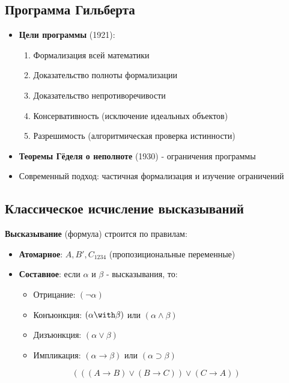 \subsection{Программа Гильберта}

\begin{itemize}
\item \textbf{Цели программы} (1921):
\begin{enumerate}
\item Формализация всей математики
\item Доказательство полноты формализации
\item Доказательство непротиворечивости
\item Консервативность (исключение идеальных объектов)
\item Разрешимость (алгоритмическая проверка истинности)
\end{enumerate}

\item \textbf{Теоремы Гёделя о неполноте} (1930) - ограничения программы
\item Современный подход: частичная формализация и изучение ограничений
\end{itemize}

\subsection{Классическое исчисление высказываний}

\begin{defrus}
\textbf{Высказывание} (формула) строится по правилам:
\begin{itemize}
\item \textbf{Атомарное}: $A, B', C_{1234}$ (пропозициональные переменные)
\item \textbf{Составное}: если $\alpha$ и $\beta$ - высказывания, то:
\begin{itemize}
\item Отрицание: $(\neg\alpha)$
\item Конъюнкция: $(\alpha\with\beta)$ или $(\alpha\wedge\beta)$
\item Дизъюнкция: $(\alpha\vee\beta)$
\item Импликация: $(\alpha\rightarrow\beta)$ или $(\alpha\supset\beta)$
\end{itemize}
\end{itemize}
\end{defrus}

\begin{exmprus}
$$(((A\rightarrow B)\vee (B\rightarrow C)) \vee (C \rightarrow A))$$
\end{exmprus}

